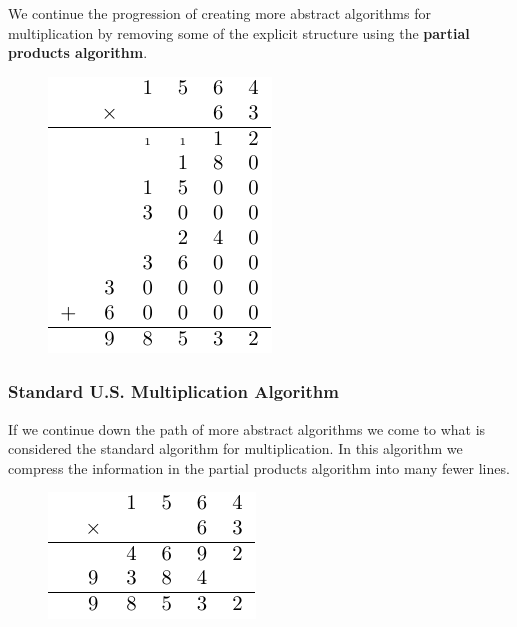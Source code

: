 \documentclass[
]{book}
\theoremstyle{definition}
\theoremstyle{definition}
\theoremstyle{definition}
\theoremstyle{definition}
\theoremstyle{remark}
\begin{document}
We continue the progression of creating more abstract algorithms for multiplication by removing some of the explicit structure using the \textbf{partial products algorithm}.

\begin{figure}

{\centering \includegraphics[width=0.6\linewidth]{tikz/partial-products} 

}

\end{figure}

\hypertarget{standard-u.s.-multiplication-algorithm}{%
\subsubsection*{Standard U.S. Multiplication Algorithm}\label{standard-u.s.-multiplication-algorithm}}

If we continue down the path of more abstract algorithms we come to what is considered the standard algorithm for multiplication. In this algorithm we compress the information in the partial products algorithm into many fewer lines.

\begin{figure}

{\centering \includegraphics[width=0.6\linewidth]{tikz/multiplication-algorithm-standard} 

}

\end{figure}
\end{document}

